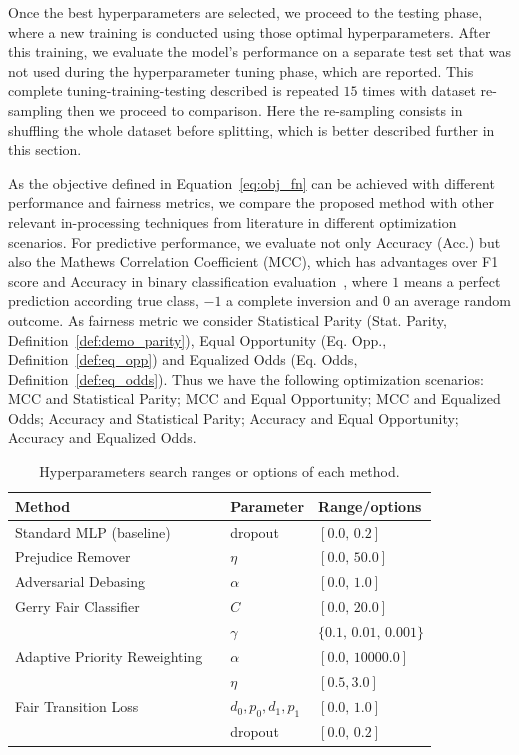 Once the best hyperparameters are selected, we proceed to the testing phase, where a new training is conducted using those optimal hyperparameters. After this training, we evaluate the model's performance on a separate test set that was not used during the hyperparameter tuning phase, which are reported. This complete tuning-training-testing described is repeated $15$ times with dataset re-sampling then we proceed to comparison. Here the re-sampling consists in shuffling the whole dataset before splitting, which is better described further in this section.

As the objective defined in Equation~\ref{eq:obj_fn} can be achieved with different performance and fairness metrics, we compare the proposed method with other relevant in-processing techniques from literature in different optimization scenarios. For predictive performance, we evaluate not only Accuracy (Acc.) but also the Mathews Correlation Coefficient (MCC), which has advantages over F1 score and Accuracy in binary classification evaluation~\citep{chicco2020advantages}, where $1$ means a perfect prediction according true class, $-1$ a complete inversion and $0$ an average random outcome. As fairness metric we consider Statistical Parity (Stat. Parity, Definition~\ref{def:demo_parity}), Equal Opportunity (Eq. Opp., Definition~\ref{def:eq_opp}) and Equalized Odds (Eq. Odds, Definition~\ref{def:eq_odds}). Thus we have the following optimization scenarios: MCC and Statistical Parity; MCC and Equal Opportunity; MCC and Equalized Odds; Accuracy and Statistical Parity; Accuracy and Equal Opportunity; Accuracy and Equalized Odds.

\begin{table}[ht]
\centering
\caption{Hyperparameters search ranges or options of each method.}\label{tab:hyperparameters}
{\footnotesize
\begin{tabular}{lll}
\toprule
Method & Parameter & Range/options \\ \midrule 
 Standard MLP (baseline) & dropout & $[0.0,\,0.2]$  \vspace{1ex} \\ 
 Prejudice Remover~\citep{Kamishima2012} & $\eta$ & $[0.0,\,50.0]$ \vspace{1ex} \\  
 Adversarial Debasing~\citep{Zhang2018}& $\alpha$ & $[0.0,\,1.0]$  \vspace{1ex} \\ 
 Gerry Fair Classifier~\citep{kearns18a} & $C$ & $[0.0,\,20.0]$ \\ 
 &  $\gamma$ & $\{0.1,\,0.01,\,0.001\}$ \vspace{1ex} \\  
 Adaptive Priority Reweighting~~\citep{HuXT23} & $\alpha$ & $[0.0,\,10000.0]$ \\ 
 &  $\eta$ & $[0.5, 3.0]$ \vspace{1ex} \\  
 Fair Transition Loss & $d_0,p_0,d_1,p_1$ & $[0.0,\,1.0]$ \\ 
 &  dropout & $[0.0,\,0.2]$ \\ 
\bottomrule
\end{tabular}
}
\end{table}

